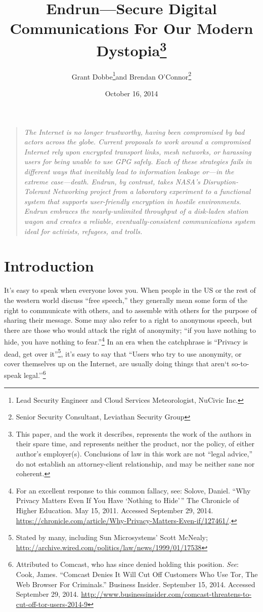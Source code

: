 \documentclass[12pt]{article}
\title{Endrun---Secure Digital Communications For Our Modern Dystopia\footnote{This paper, and the work it describes, represents the work of the authors in their spare time, and represents neither the product, nor the policy, of either author's employer(s). Conclusions of law in this work are not ``legal advice,'' do not establish an attorney-client relationship, and may be neither sane nor coherent.}}
\author{Grant Dobbe\footnote{Lead Security Engineer and Cloud Services Meteorologist, NuCivic Inc.}\space\space and Brendan O'Connor\footnote{Senior Security Consultant, Leviathan Security Group}}
\date{October 16, 2014}
\begin{document}
	
	\maketitle
  
  \begin{quote}
    \emph{The Internet is no longer trustworthy, having been compromised by bad actors across the globe. Current proposals to work around a compromised Internet rely upon encrypted transport links, mesh networks, or harassing users for being unable to use GPG safely. Each of these strategies fails in different ways that inevitably lead to information leakage or---in the extreme case---death. Endrun, by contrast, takes NASA's Disruption-Tolerant Networking project from a laboratory experiment to a functional system that supports user-friendly encryption in hostile environments. Endrun embraces the nearly-unlimited throughput of a disk-laden station wagon and creates a reliable, eventually-consistent communications system ideal for activists, refugees, and trolls.}
    \end{quote}
	
	\section{Introduction}
	
  It's easy to speak when everyone loves you. When people in the US or the rest of the western world discuss ``free speech,'' they generally mean some form of the right to communicate with others, and to assemble with others for the purpose of sharing their message. Some may also refer to a right to anonymous speech, but there are those who would attack the right of anonymity; ``if you have nothing to hide, you have nothing to fear.''\footnote{For an excellent response to this common fallacy, see: Solove, Daniel. ``Why Privacy Matters Even If You Have `Nothing to Hide'\,'' The Chronicle of Higher Education. May 15, 2011. Accessed September 29, 2014. \url{https://chronicle.com/article/Why-Privacy-Matters-Even-if/127461/}.} In an era when the catchphrase is ``Privacy is dead, get over it''\footnote{Stated by many, including Sun Microsystems' Scott McNealy; \url{http://archive.wired.com/politics/law/news/1999/01/17538}}, it's easy to say that ``Users who try to use anonymity, or cover themselves up on the Internet, are usually doing things that aren`t so-to-speak legal.''\footnote{Attributed to Comcast, who has since denied holding this position. \emph{See}: Cook, James. ``Comcast Denies It Will Cut Off Customers Who Use Tor, The Web Browser For Criminals.'' Business Insider. September 15, 2014. Accessed September 29, 2014. \url{http://www.businessinsider.com/comcast-threatens-to-cut-off-tor-users-2014-9}}
  
\end{document}
